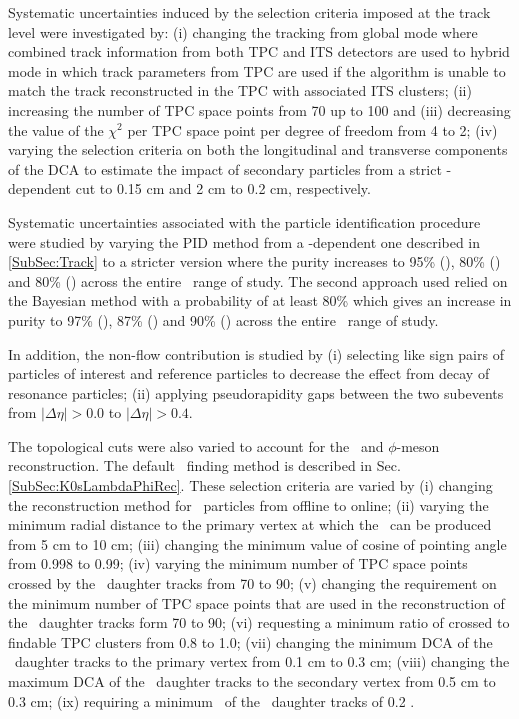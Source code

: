 \documentclass[ALICE,manyauthors]{cernphprep}
\begin{document}
Systematic uncertainties induced by the selection criteria imposed at the track level were investigated by: (i) changing the tracking from global mode where combined track information from both TPC and ITS detectors are used to hybrid mode in which track parameters from TPC are used if the algorithm is unable to match the track reconstructed in the TPC with associated ITS clusters; (ii) increasing the number of TPC space points from 70 up to 100 and (iii) decreasing the value of the $\chi^{2}$ per TPC space point per degree of freedom from 4 to 2; (iv) varying the selection criteria on both the longitudinal and transverse components of the DCA to estimate the impact of secondary particles from a strict \pT-dependent cut to 0.15 cm and 2 cm to 0.2 cm, respectively.



Systematic uncertainties associated with the particle identification procedure were studied by varying the PID method from a \pT-dependent one described in \ref{SubSec:Track} to a stricter version where the purity increases to 95\% (\pion), 80\% (\kaon) and 80\% (\proton) across the entire \pT~range of study. The second approach used relied on the Bayesian method with a probability of at least 80\% which gives an increase in purity to 97\% (\pion), 87\% (\kaon) and 90\% (\proton) across the entire \pT~range of study. 

In addition, the non-flow contribution is studied by (i) selecting like sign pairs of particles of interest and reference particles to decrease the effect from decay of resonance particles; (ii) applying pseudorapidity gaps between the two subevents from $|\Delta\eta|>0.0$ to $|\Delta\eta|>0.4$.

The topological cuts were also varied to account for the \vo~and $\phi$-meson reconstruction. The default \vo~finding method is described in Sec. \ref{SubSec:K0sLambdaPhiRec}. These selection criteria are varied by (i) changing the reconstruction method for \vo~particles from offline to online; (ii) varying the minimum radial distance to the primary vertex at which the \vo~can be produced from 5 cm to 10 cm; (iii) changing the minimum value of cosine of pointing angle from 0.998 to 0.99; (iv) varying the minimum number of TPC space points crossed by the \vo~daughter tracks from 70 to 90; (v) changing the requirement on the minimum number of TPC space points that are used in the reconstruction of the \vo~daughter tracks form 70 to 90; (vi) requesting a minimum ratio of crossed to findable TPC clusters from 0.8 to 1.0; (vii) changing the minimum DCA of the \vo~daughter tracks to the primary vertex from 0.1 cm to 0.3 cm; (viii) changing the maximum DCA of the \vo~daughter tracks to the secondary vertex from 0.5 cm to 0.3 cm; (ix) requiring a minimum \pT~of the \vo~daughter tracks of 0.2 \GeV. 
\end{document}
